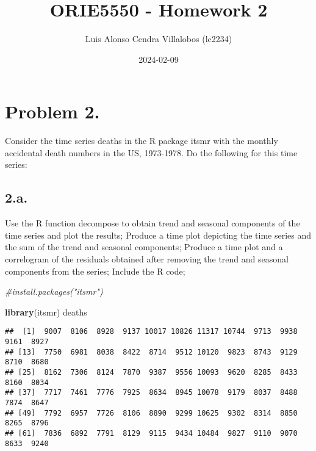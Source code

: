 \documentclass[
]{article}
\title{ORIE5550 - Homework 2}
\author{Luis Alonso Cendra Villalobos (lc2234)}
\date{2024-02-09}
\newenvironment{Shaded}{\begin{snugshade}}{\end{snugshade}}
\newcommand{\CommentTok}[1]{\textcolor[rgb]{0.56,0.35,0.01}{\textit{#1}}}
\newcommand{\FunctionTok}[1]{\textcolor[rgb]{0.13,0.29,0.53}{\textbf{#1}}}
\newcommand{\NormalTok}[1]{#1}
\begin{document}
\maketitle

\hypertarget{problem-2.}{%
\section{Problem 2.}\label{problem-2.}}

Consider the time series deaths in the R package itsmr with the monthly
accidental death numbers in the US, 1973-1978. Do the following for this
time series:

\hypertarget{a.}{%
\subsection{2.a.}\label{a.}}

Use the R function decompose to obtain trend and seasonal components of
the time series and plot the results; Produce a time plot depicting the
time series and the sum of the trend and seasonal components; Produce a
time plot and a correlogram of the residuals obtained after removing the
trend and seasonal components from the series; Include the R code;

\begin{Shaded}
\begin{Highlighting}[]
\CommentTok{\#install.packages("itsmr")}

\FunctionTok{library}\NormalTok{(itsmr)}
\NormalTok{deaths}
\end{Highlighting}
\end{Shaded}

\begin{verbatim}
##  [1]  9007  8106  8928  9137 10017 10826 11317 10744  9713  9938  9161  8927
## [13]  7750  6981  8038  8422  8714  9512 10120  9823  8743  9129  8710  8680
## [25]  8162  7306  8124  7870  9387  9556 10093  9620  8285  8433  8160  8034
## [37]  7717  7461  7776  7925  8634  8945 10078  9179  8037  8488  7874  8647
## [49]  7792  6957  7726  8106  8890  9299 10625  9302  8314  8850  8265  8796
## [61]  7836  6892  7791  8129  9115  9434 10484  9827  9110  9070  8633  9240
\end{verbatim}
\end{document}
